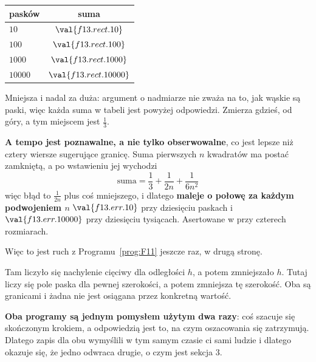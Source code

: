 \begin{fr}
\begin{ansblock}
\begin{center}
%
\begin{tabular}{lc}
\toprule
pasków & suma \\
\midrule
$\num{10}$ & $\val{f13.rect.10}$ \\
$\num{100}$ & $\val{f13.rect.100}$ \\
$\num{1000}$ & $\val{f13.rect.1000}$ \\
$\num{10000}$ & $\val{f13.rect.10000}$ \\
\bottomrule
\end{tabular}
\end{center}
\end{ansblock}

Mniejsza i nadal za duża: argument o nadmiarze nie zważa na to, jak wąskie
są paski, więc każda suma w tabeli jest powyżej odpowiedzi. Zmierza gdzieś, od
góry, a tym miejscem jest $\frac{1}{3}$.

\textbf{A tempo jest poznawalne, a nie tylko obserwowalne}, co jest lepsze niż
cztery wiersze sugerujące granicę. Suma pierwszych $n$ kwadratów ma postać
zamkniętą, a po wstawieniu jej wychodzi
\[ \text{suma} = \frac{1}{3} + \frac{1}{2n} + \frac{1}{6n^{2}} \]
więc błąd to $\frac{1}{2n}$ plus coś mniejszego, i dlatego \textbf{maleje o
połowę za każdym podwojeniem $n$} \dash{} $\val{f13.err.10}$ przy dziesięciu
paskach i $\val{f13.err.10000}$ przy dziesięciu tysiącach. Asertowane w
 przy czterech rozmiarach.

\end{fr}

\begin{fr}
Więc to jest ruch z Programu~\ref{prog:F11} jeszcze raz, w drugą stronę.

Tam liczyło się nachylenie cięciwy dla odległości $h$, a potem zmniejszało
$h$. Tutaj liczy się pole paska dla pewnej szerokości, a potem zmniejsza tę
szerokość. Oba są granicami i żadna nie jest osiągana przez konkretną wartość.

\textbf{Oba programy są jednym pomysłem użytym dwa razy}: coś szacuje się
skończonym krokiem, a odpowiedzią jest to, na czym oszacowania się zatrzymują.
Dlatego zapis dla obu wymyślili w tym samym czasie ci sami ludzie i dlatego
okazuje się, że jedno odwraca drugie, o czym jest sekcja 3.
\end{fr}

